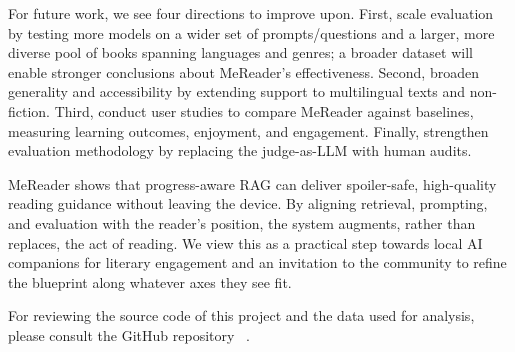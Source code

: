 For future work, we see four directions to improve upon. First, scale evaluation by testing more models on a wider set of prompts/questions and a larger, more diverse pool of books spanning languages and genres; a broader dataset will enable stronger conclusions about MeReader’s effectiveness. Second, broaden generality and accessibility by extending support to multilingual texts and non-fiction. Third, conduct user studies to compare MeReader against baselines, measuring learning outcomes, enjoyment, and engagement. Finally, strengthen evaluation methodology by replacing the judge-as-LLM with human audits.

MeReader shows that progress-aware RAG can deliver spoiler-safe, high-quality reading guidance without leaving the device.
By aligning retrieval, prompting, and evaluation with the reader's position, the system augments, rather than replaces, the act of reading.
We view this as a practical step towards local AI companions for literary engagement and an invitation to the community to refine the blueprint along whatever axes they see fit.

For reviewing the source code of this project and the data used for analysis, please consult the GitHub repository \href{https://github.com/WhiteHades/mereader}{}~\cite{b30}.